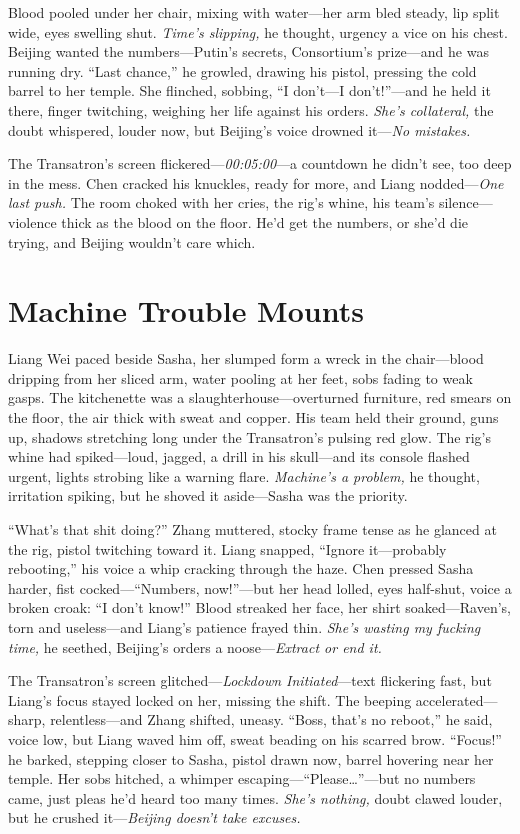 \documentclass[12pt]{book}
\begin{document}
Blood pooled under her chair, mixing with water—her arm bled steady, lip split wide, eyes swelling shut. \textit{Time’s slipping,} he thought, urgency a vice on his chest. Beijing wanted the numbers—Putin’s secrets, Consortium’s prize—and he was running dry. “Last chance,” he growled, drawing his pistol, pressing the cold barrel to her temple. She flinched, sobbing, “I don’t—I don’t!”—and he held it there, finger twitching, weighing her life against his orders. \textit{She’s collateral,} the doubt whispered, louder now, but Beijing’s voice drowned it—\textit{No mistakes.}

The Transatron’s screen flickered—\textit{00:05:00}—a countdown he didn’t see, too deep in the mess. Chen cracked his knuckles, ready for more, and Liang nodded—\textit{One last push.} The room choked with her cries, the rig’s whine, his team’s silence—violence thick as the blood on the floor. He’d get the numbers, or she’d die trying, and Beijing wouldn’t care which.

\section{Machine Trouble Mounts}

Liang Wei paced beside Sasha, her slumped form a wreck in the chair—blood dripping from her sliced arm, water pooling at her feet, sobs fading to weak gasps. The kitchenette was a slaughterhouse—overturned furniture, red smears on the floor, the air thick with sweat and copper. His team held their ground, guns up, shadows stretching long under the Transatron’s pulsing red glow. The rig’s whine had spiked—loud, jagged, a drill in his skull—and its console flashed urgent, lights strobing like a warning flare. \textit{Machine’s a problem,} he thought, irritation spiking, but he shoved it aside—Sasha was the priority.

“What’s that shit doing?” Zhang muttered, stocky frame tense as he glanced at the rig, pistol twitching toward it. Liang snapped, “Ignore it—probably rebooting,” his voice a whip cracking through the haze. Chen pressed Sasha harder, fist cocked—“Numbers, now!”—but her head lolled, eyes half-shut, voice a broken croak: “I don’t know!” Blood streaked her face, her shirt soaked—Raven’s, torn and useless—and Liang’s patience frayed thin. \textit{She’s wasting my fucking time,} he seethed, Beijing’s orders a noose—\textit{Extract or end it.}

The Transatron’s screen glitched—\textit{Lockdown Initiated}—text flickering fast, but Liang’s focus stayed locked on her, missing the shift. The beeping accelerated—sharp, relentless—and Zhang shifted, uneasy. “Boss, that’s no reboot,” he said, voice low, but Liang waved him off, sweat beading on his scarred brow. “Focus!” he barked, stepping closer to Sasha, pistol drawn now, barrel hovering near her temple. Her sobs hitched, a whimper escaping—“Please…”—but no numbers came, just pleas he’d heard too many times. \textit{She’s nothing,} doubt clawed louder, but he crushed it—\textit{Beijing doesn’t take excuses.}
\end{document}
